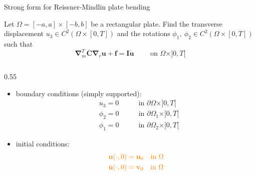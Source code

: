 \documentclass[aspectratio=169]{beamer}
\begin{document}
{
\color{white}
\begin{frame}{Strong form for Reissner-Mindlin plate bending}
  \begin{block}{}
    Let $\Omega=[-a,a]\times[-b,b]$ be a rectangular plate. Find the transverse displacement $u_{3}\in C^2(\Omega\times[0,T])$ and the rotations $\phi_1,\ \phi_2\in C^2(\Omega\times[0,T])$ such that
    $$
      \boldsymbol\nabla_m^T \overline{\boldsymbol{C}}\boldsymbol\nabla_r\mathbf{u}+\mathbf f=\mathbf{I} \ddot{\mathbf u} \qquad \text{  on  }\Omega\times]0,T[
    $$
    \vspace{-0.5cm}
    \begin{columns}
      \begin{column}{0.55\textwidth}
        \begin{itemize}
          \item boundary conditions (simply supported):
                \vspace{-0.2cm}
                \[
                  \begin{aligned}
                     & u_3 = 0\qquad   & \text{in }\partial\Omega\times]0,T[   \\
                     & \phi_2 =0\qquad & \text{in }\partial\Omega_1\times]0,T[ \\
                     & \phi_1 =0\qquad & \text{in }\partial\Omega_2\times]0,T[
                  \end{aligned}
                \]
          \item
                initial conditions:
                \vspace{-0.2cm}
                \[
                  \begin{aligned}
                     & \color{orange}{\mathbf u(\cdot, 0) =  \mathbf u_0 \quad \text{in }\Omega}      \\
                     & \color{orange}{\dot{\mathbf u}(\cdot, 0) = \mathbf v_0 \quad \text{in }\Omega} \\
                  \end{aligned}
                \]
        \end{itemize}
      \end{column}


\end{columns}
\end{block}
\end{frame}}
\end{document}
